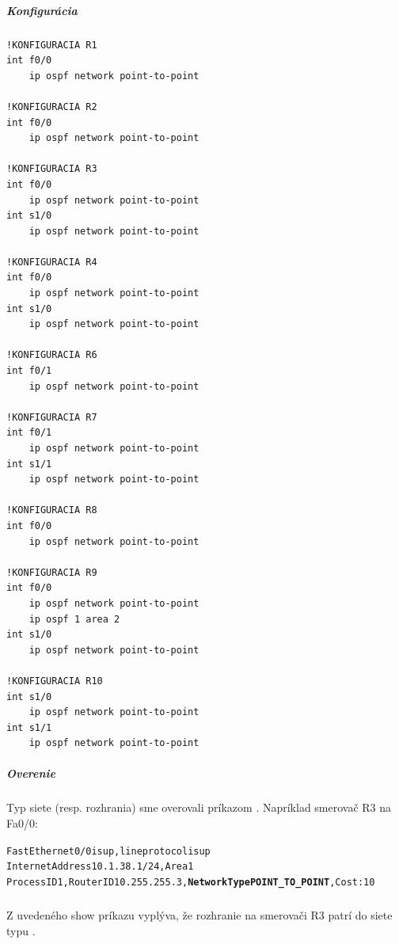 \documentclass[12pt,twoside,a4paper]{article}
\begin{document}
\subparagraph{Konfigurácia}

\noindent
{\selectfont

\begin{small}

\begin{verbatim}
!KONFIGURACIA R1
int f0/0
    ip ospf network point-to-point

!KONFIGURACIA R2
int f0/0
    ip ospf network point-to-point

!KONFIGURACIA R3
int f0/0
    ip ospf network point-to-point
int s1/0
    ip ospf network point-to-point

!KONFIGURACIA R4
int f0/0
    ip ospf network point-to-point
int s1/0
    ip ospf network point-to-point

!KONFIGURACIA R6
int f0/1
    ip ospf network point-to-point

!KONFIGURACIA R7
int f0/1
    ip ospf network point-to-point
int s1/1
    ip ospf network point-to-point

!KONFIGURACIA R8
int f0/0
    ip ospf network point-to-point

!KONFIGURACIA R9
int f0/0
    ip ospf network point-to-point
    ip ospf 1 area 2
int s1/0
    ip ospf network point-to-point

!KONFIGURACIA R10
int s1/0
    ip ospf network point-to-point
int s1/1
    ip ospf network point-to-point
\end{verbatim}

\end{small}

}

\subparagraph{Overenie}
\subparagraph{}
Typ siete (resp. rozhrania) sme overovali príkazom . Napríklad smerovač R3 na Fa0/0:

\noindent
{\selectfont
\begin{small}
\begin{alltt}
FastEthernet0/0 is up, line protocol is up 
  Internet Address 10.1.38.1/24, Area 1 
  Process ID 1, Router ID 10.255.255.3, \textbf{Network Type POINT_TO_POINT}, Cost: 10
\end{alltt}
\end{small}
}

\subparagraph{}
Z uvedeného show príkazu vyplýva, že rozhranie  na smerovači R3 patrí do siete typu .
\end{document}
